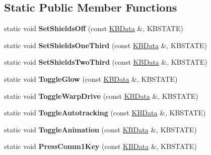\subsection*{Static Public Member Functions}
\begin{DoxyCompactItemize}
\item 
static void {\bfseries Set\+Shields\+Off} (const \hyperlink{classKBData}{K\+B\+Data} \&, K\+B\+S\+T\+A\+TE)\hypertarget{classFireKeyboard_a1de26895e9da4dbedbb1a8affb0f45e7}{}\label{classFireKeyboard_a1de26895e9da4dbedbb1a8affb0f45e7}

\item 
static void {\bfseries Set\+Shields\+One\+Third} (const \hyperlink{classKBData}{K\+B\+Data} \&, K\+B\+S\+T\+A\+TE)\hypertarget{classFireKeyboard_a0f0dab52d8cc4b98a0a26f2ce1c14e52}{}\label{classFireKeyboard_a0f0dab52d8cc4b98a0a26f2ce1c14e52}

\item 
static void {\bfseries Set\+Shields\+Two\+Third} (const \hyperlink{classKBData}{K\+B\+Data} \&, K\+B\+S\+T\+A\+TE)\hypertarget{classFireKeyboard_ad76b430eb29b98fa4a88a9e007d0647f}{}\label{classFireKeyboard_ad76b430eb29b98fa4a88a9e007d0647f}

\item 
static void {\bfseries Toggle\+Glow} (const \hyperlink{classKBData}{K\+B\+Data} \&, K\+B\+S\+T\+A\+TE)\hypertarget{classFireKeyboard_ab93a3e7fcacb7971234f0224981d383f}{}\label{classFireKeyboard_ab93a3e7fcacb7971234f0224981d383f}

\item 
static void {\bfseries Toggle\+Warp\+Drive} (const \hyperlink{classKBData}{K\+B\+Data} \&, K\+B\+S\+T\+A\+TE)\hypertarget{classFireKeyboard_a48b0cb1c0a487f5dbd38140767c7afed}{}\label{classFireKeyboard_a48b0cb1c0a487f5dbd38140767c7afed}

\item 
static void {\bfseries Toggle\+Autotracking} (const \hyperlink{classKBData}{K\+B\+Data} \&, K\+B\+S\+T\+A\+TE)\hypertarget{classFireKeyboard_a5935493a6ca126db1f471e30d6dc381d}{}\label{classFireKeyboard_a5935493a6ca126db1f471e30d6dc381d}

\item 
static void {\bfseries Toggle\+Animation} (const \hyperlink{classKBData}{K\+B\+Data} \&, K\+B\+S\+T\+A\+TE)\hypertarget{classFireKeyboard_a5355fbb34cc4d72b3843fbdea38f6982}{}\label{classFireKeyboard_a5355fbb34cc4d72b3843fbdea38f6982}

\item 
static void {\bfseries Press\+Comm1\+Key} (const \hyperlink{classKBData}{K\+B\+Data} \&, K\+B\+S\+T\+A\+TE)\hypertarget{classFireKeyboard_ae214e9ed0f1fd43e2b1fdb874ae2f673}{}\label{classFireKeyboard_ae214e9ed0f1fd43e2b1fdb874ae2f673}


\end{DoxyCompactItemize}
